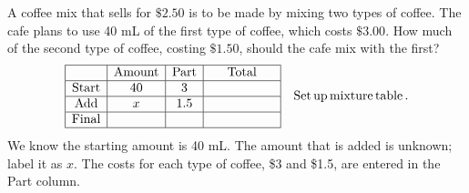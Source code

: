 \begin{example}
  A coffee mix that sells for $\$2.50$ is to be made by mixing two
  types of coffee. The cafe plans to use 40 mL of the first type of coffee, which costs $\$3.00$.
  How much of the second type of coffee, costing $\$1.50$, should the cafe mix with the first?
  \begin{eqnarray*}
    \begin{array}{|c|c|c|c|}
      \hline
      & \tmop{Amount} & \tmop{Part} & \tmop{Total}\\
      \hline
      \tmop{Start} & 40 & 3 & \mbox{\hspace{.70in}}\\
      \hline
      \tmop{Add} & x & 1.5 & \\
      \hline
      \tmop{Final} &  &  & \\
      \hline
    \end{array} &  & %
      \tmop{Set} \tmop{up} \tmop{mixture} \tmop{table}.
	\end{eqnarray*}
	We know the starting amount is 40 mL.  The amount that is added is unknown; label it as $x$.  The costs for each type of coffee, \$3 and \$1.5, are entered in the Part column.
	

\end{example}
